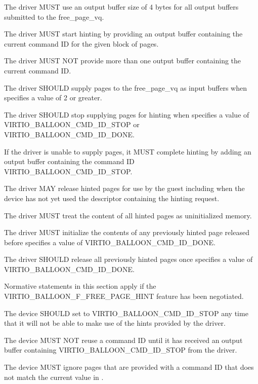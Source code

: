 The driver MUST use an output buffer size of 4 bytes for all output
buffers submitted to the free_page_vq.

The driver MUST start hinting by providing an output buffer containing
the current command ID for the given block of pages.

The driver MUST NOT provide more than one output buffer containing the
current command ID.

The driver SHOULD supply pages to the free_page_vq as input buffers when
 specifies a value of 2 or greater.

The driver SHOULD stop supplying pages for hinting when
 specifies a value of VIRTIO_BALLOON_CMD_ID_STOP
or VIRTIO_BALLOON_CMD_ID_DONE.

If the driver is unable to supply pages, it MUST complete hinting by adding
an output buffer containing the command ID VIRTIO_BALLOON_CMD_ID_STOP.

The driver MAY release hinted pages for use by the guest including when the
device has not yet used the descriptor containing the hinting request.

The driver MUST treat the content of all hinted pages as uninitialized
memory.

The driver MUST initialize the contents of any previously hinted page
released before  specifies a value of
VIRTIO_BALLOON_CMD_ID_DONE.

The driver SHOULD release all previously hinted pages once
 specifies a value of
VIRTIO_BALLOON_CMD_ID_DONE.


Normative statements in this section apply if the
VIRTIO_BALLOON_F_FREE_PAGE_HINT feature has been negotiated.

The device SHOULD set  to
VIRTIO_BALLOON_CMD_ID_STOP any time that it will not be able to make use
of the hints provided by the driver.

The device MUST NOT reuse a command ID until it has received an output
buffer containing VIRTIO_BALLOON_CMD_ID_STOP from the driver.

The device MUST ignore pages that are provided with a command ID that does
not match the current value in .

